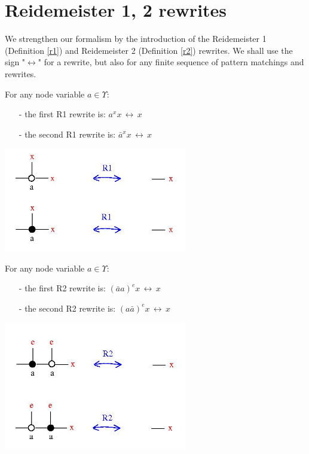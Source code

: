 \section{Reidemeister 1, 2  rewrites}


We strengthen our formalism by the introduction of the Reidemeister 1 (Definition \ref{r1}) and Reidemeister 2 (Definition \ref{r2}) rewrites. We shall use the sign "$\displaystyle \longleftrightarrow$" for a rewrite, but also for any finite sequence of pattern matchings and rewrites. 

\begin{definition}
For any node variable $a \in \Upsilon$: 
\begin{enumerate}
\item[-] the first R1 rewrite is: $\displaystyle a^{x} x \, \longleftrightarrow \, x$
\item[-] the second R1 rewrite is:  $\displaystyle \bar{a}^{x} x \, \longleftrightarrow \, x$
\end{enumerate}
\centerline{\includegraphics[width=80mm]{jpg/r1.jpg}}  
\label{r1}
\end{definition}



\begin{definition}
For any node variable $a \in \Upsilon$: 
\begin{enumerate}
\item[-] the first R2 rewrite is: $\displaystyle \left(\bar{a} a \right)^{e} x \, \longleftrightarrow \, x$
\item[-] the second R2 rewrite is:  $\displaystyle \left(a  \bar{a}\right)^{e} x \, \longleftrightarrow \, x$
\end{enumerate}
\centerline{\includegraphics[width=80mm]{jpg/r2.jpg}}
\label{r2}
\end{definition}





